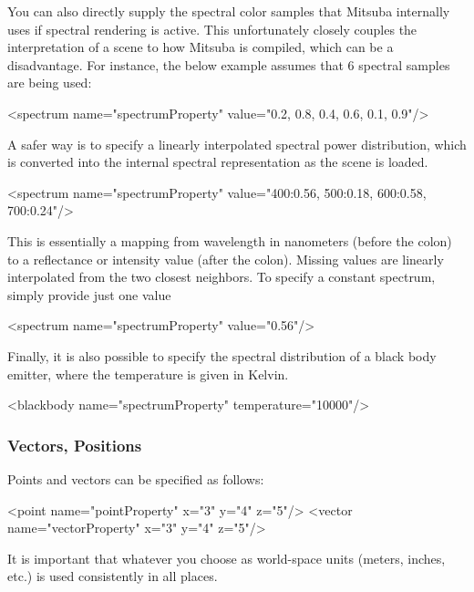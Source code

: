 You can also directly supply the spectral color samples that Mitsuba internally uses if spectral rendering is
active. This unfortunately closely couples the interpretation of a scene to how Mitsuba is compiled, which can be a disadvantage.
For instance, the below example assumes that 6 spectral samples are being used:
\begin{xml}
<spectrum name="spectrumProperty" value="0.2, 0.8, 0.4, 0.6, 0.1, 0.9"/>
\end{xml}
A safer way is to specify a linearly interpolated spectral power distribution, which is converted into
the internal spectral representation as the scene is loaded.
\begin{xml}
<spectrum name="spectrumProperty" value="400:0.56, 500:0.18, 600:0.58, 700:0.24"/>
\end{xml}
This is essentially a mapping from wavelength in nanometers (before the colon) to a reflectance or intensity value (after the colon). Missing values are linearly interpolated from the two closest neighbors.
To specify a constant spectrum, simply provide just one value
\begin{xml}
<spectrum name="spectrumProperty" value="0.56"/>
\end{xml}

Finally, it is also possible to specify the spectral distribution of a black body emitter, where the temperature is given in Kelvin.
\begin{xml}
<blackbody name="spectrumProperty" temperature="10000"/>
\end{xml}
\subsubsection{Vectors, Positions}
Points and vectors can be specified as follows:
\begin{xml}
<point name="pointProperty" x="3" y="4" z="5"/>
<vector name="vectorProperty" x="3" y="4" z="5"/>
\end{xml}
It is important that whatever you choose as world-space units (meters, inches, etc.) is 
used consistently in all places.
